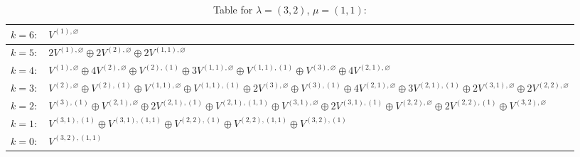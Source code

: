 \documentclass[a4paper,12pt]{article}
\begin{document}
\renewcommand{\arraystretch}{1.6} 
\begin{table}[H]
\centering
\caption{Table for $\lambda = (3, 2)$, $\mu = (1, 1)$:}
\begin{tabular}{|>{\centering\arraybackslash}p{15cm}|}
\hline
 $k = 6: \quad V^{(1), \varnothing} $ \\ \hline
 $k = 5: \quad 2 V^{(1), \varnothing} \oplus 2 V^{(2), \varnothing} \oplus 2 V^{(1, 1), \varnothing} $ \\ \hline
 $k = 4: \quad V^{(1), \varnothing} \oplus 4 V^{(2), \varnothing} \oplus V^{(2), (1)} \oplus 3 V^{(1, 1), \varnothing} \oplus V^{(1, 1), (1)} \oplus V^{(3), \varnothing} \oplus 4 V^{(2, 1), \varnothing} $ \\ \hline
 $k = 3: \quad V^{(2), \varnothing} \oplus V^{(2), (1)} \oplus V^{(1, 1), \varnothing} \oplus V^{(1, 1), (1)} \oplus 2 V^{(3), \varnothing} \oplus V^{(3), (1)} \oplus 4 V^{(2, 1), \varnothing} \oplus 3 V^{(2, 1), (1)} \oplus 2 V^{(3, 1), \varnothing} \oplus 2 V^{(2, 2), \varnothing} $ \\ \hline
 $k = 2: \quad V^{(3), (1)} \oplus V^{(2, 1), \varnothing} \oplus 2 V^{(2, 1), (1)} \oplus V^{(2, 1), (1, 1)} \oplus V^{(3, 1), \varnothing} \oplus 2 V^{(3, 1), (1)} \oplus V^{(2, 2), \varnothing} \oplus 2 V^{(2, 2), (1)} \oplus V^{(3, 2), \varnothing} $ \\ \hline
 $k = 1: \quad V^{(3, 1), (1)} \oplus V^{(3, 1), (1, 1)} \oplus V^{(2, 2), (1)} \oplus V^{(2, 2), (1, 1)} \oplus V^{(3, 2), (1)} $ \\ \hline
 $k = 0: \quad V^{(3, 2), (1, 1)} $ \\ \hline
\end{tabular}
\end{table}
\end{document}
